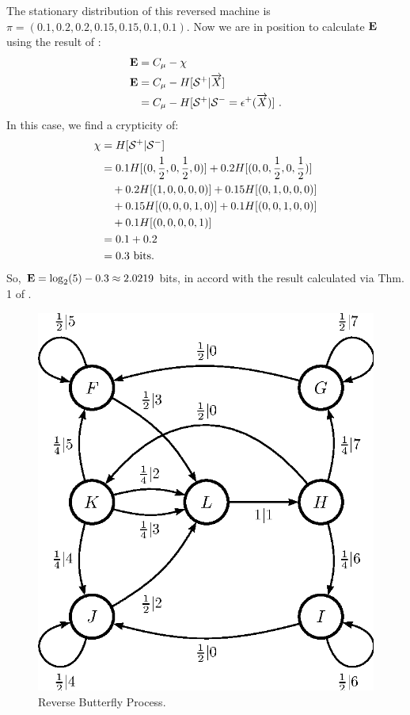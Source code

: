 \documentclass[prl,twocolumn,showpacs,superscriptaddress,preprintnumbers,floatfix]{revtex4}
\theoremstyle{plain}   \newtheorem{Lem}{Lemma}
\theoremstyle{plain} 	\newtheorem{Cor}{Corollary}
\theoremstyle{plain} 	\newtheorem{The}{Theorem}
\theoremstyle{plain} 	\newtheorem{Prop}{Proposition}
\theoremstyle{plain} 	\newtheorem*{Conj}{Conjecture}
\theoremstyle{plain}	\newtheorem*{Rem}{Remark}
\theoremstyle{plain}	\newtheorem*{Def}{Definition}
\theoremstyle{plain}	\newtheorem*{Not}{Notation}
\begin{document}
The stationary distribution of this reversed machine is
$\pi = (0.1, 0.2, 0.2, 0.15, 0.15, 0.1, 0.1)$. Now we are in position
to calculate ${\bf E}$ using the result of :
\begin{align}
{\bf E} &= C_\mu - \chi \\
{\bf E} &= C_\mu - H[{\mathcal{S}}^{+} | \overrightarrow{{X}}] \\
    &= C_\mu - H[{\mathcal{S}}^{+} | {\mathcal{S}}^{-} =
	\epsilon^{+}(\overrightarrow{{X}})] ~.
\end{align}
In this case, we find a crypticity of:
\begin{align*}
  \chi & = H[{\mathcal{S}}^{+} | {\mathcal{S}}^{-}] \\
    & =  0.1 H[(0,\frac{1}{2},0,\frac{1}{2},0)]
		+ 0.2 H[(0,0,\frac{1}{2},0,\frac{1}{2})] \\
	& \quad + 0.2 H[(1,0,0,0,0)]
		+ 0.15 H[(0,1,0,0,0)] \\
	& \quad + 0.15 H[(0,0,0,1,0)]
		+ 0.1 H[(0,0,1,0,0)] \\
	& \quad + 0.1 H[(0,0,0,0,1)] \\
    & = 0.1 + 0.2 \\
	& = 0.3 ~\mathrm{bits}.
\end{align*}
So, ${\bf E} = \log_2 (5) - 0.3 \approx 2.0219$ bits, in accord with the result
calculated via Thm. 1 of .

\begin{figure}[th]
\centering
\includegraphics{butterfly_reM_ur.eps}
\caption{Reverse Butterfly Process.
  }
\label{fig:ReverseButterflyProcess}
\end{figure}
\end{document}
